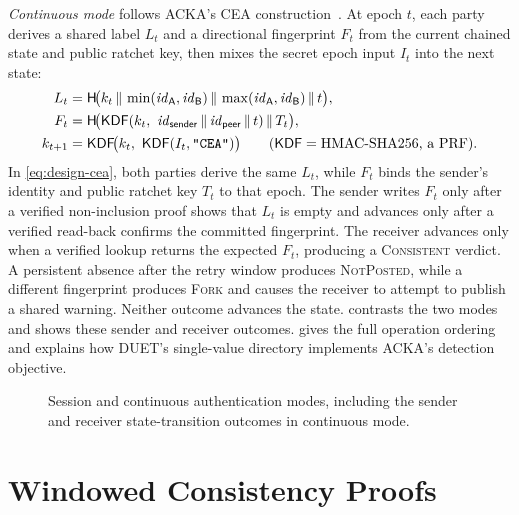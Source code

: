 \emph{Continuous mode} follows ACKA's CEA construction~\cite{dowling2023acka}. At epoch $t$, each party derives a shared label
$L_t$ and a directional fingerprint $F_t$ from the current chained state and public ratchet key, then
mixes the secret epoch input $I_t$ into the next state:
\begin{equation}\label{eq:design-cea}
\begin{aligned}
  L_t &= \mathsf{H}\!\big(k_t \,\|\, \min(\mathit{id}_{\mathsf{A}}, \mathit{id}_{\mathsf{B}}) \,\|\, \max(\mathit{id}_{\mathsf{A}}, \mathit{id}_{\mathsf{B}}) \,\|\, t\big),\\
  F_t &= \mathsf{H}\!\big(\mathsf{KDF}(k_t,\ \mathit{id}_{\mathsf{sender}} \,\|\, \mathit{id}_{\mathsf{peer}} \,\|\, t) \,\|\, T_t\big),\\
  k_{t+1} &= \mathsf{KDF}\!\big(k_t,\ \mathsf{KDF}(I_t, \text{\texttt{"CEA"}})\big) \qquad (\mathsf{KDF} = \text{HMAC-SHA256, a PRF}).
\end{aligned}
\end{equation}
In \cref{eq:design-cea}, both parties derive the same $L_t$, while $F_t$ binds the sender's
identity and public ratchet key $T_t$ to that epoch. The sender writes $F_t$ only after a verified
non-inclusion proof shows that $L_t$ is empty and advances only after a verified read-back confirms
the committed fingerprint. The receiver advances only when a verified lookup
returns the expected $F_t$, producing a \textsc{Consistent} verdict. A persistent absence after the
retry window produces \textsc{NotPosted}, while a different fingerprint produces \textsc{Fork} and
causes the receiver to attempt to publish a shared warning. Neither outcome advances the state.
 contrasts the two modes and shows these sender and receiver outcomes.
 gives the full operation ordering and explains how DUET's single-value
directory implements ACKA's detection objective.

\begin{figure}[H]
\centering

\caption[Session mode versus continuous mode.]{Session and continuous authentication modes,
including the sender and receiver state-transition outcomes in continuous mode.}
\label{fig:design-modes}
\end{figure}

\FloatBarrier
\section{Windowed Consistency Proofs}\label{sec:design-windowed}

